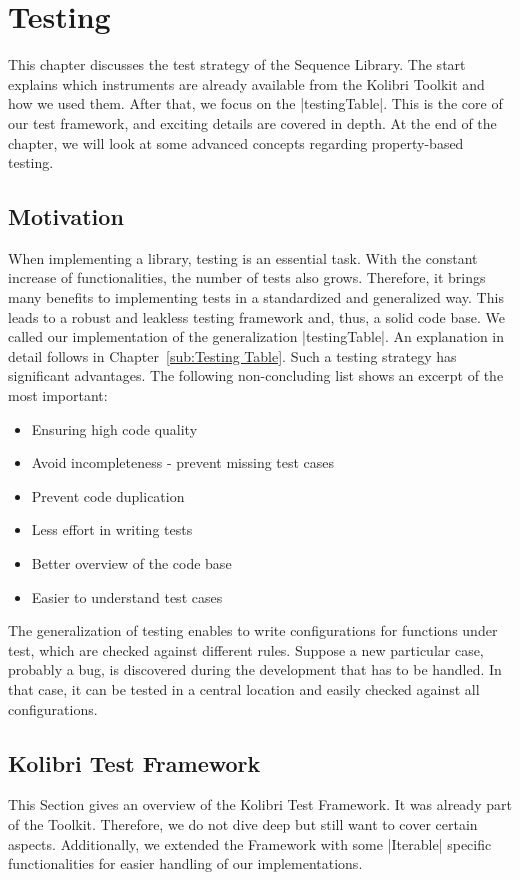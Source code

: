 \section{Testing}
\label{sec:Testing}
This chapter discusses the test strategy of the Sequence Library. The start
explains which instruments are already available from the Kolibri Toolkit and
how we used them. After that, we focus on the |testingTable|. 
This is the core of our test framework, and exciting details are covered in
depth. At the end of the chapter, we will look at some advanced concepts
regarding property-based testing.

\subsection{Motivation}
\label{sub:Motivation}
When implementing a library, testing is an essential task. With the constant
increase of functionalities, the number of tests also grows. Therefore, it
brings many benefits to implementing tests in a standardized and generalized
way. This leads to a robust and
leakless testing framework and, thus, a solid code base.
We called our implementation of the generalization |testingTable|.
An explanation in detail follows in Chapter~\ref{sub:Testing Table}.
Such a testing strategy has significant advantages. 
The following non-concluding list shows an excerpt of the most important:

\begin{itemize}
  \item{Ensuring high code quality}
  \item{Avoid incompleteness - prevent missing test cases}
  \item{Prevent code duplication}
  \item{Less effort in writing tests}
  \item{Better overview of the code base}
  \item{Easier to understand test cases}
\end{itemize}

The generalization of testing enables to write configurations for functions
under test, which are checked against different rules. Suppose a new particular case, probably a bug, is
discovered during the development that has to be handled. In that case, it can
be tested in a central location and easily checked against all configurations.

\subsection{Kolibri Test Framework}
\label{sub:Kolibri Test Framework}
This Section gives an overview of the Kolibri Test Framework. It was already
part of the Toolkit. Therefore, we do not dive deep but still want to cover
certain aspects. Additionally, we extended the Framework with some |Iterable|
specific functionalities for easier handling of our implementations.

